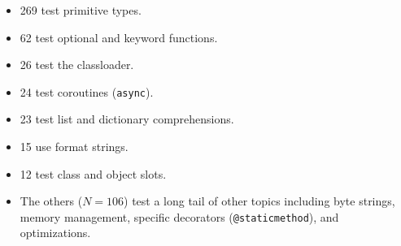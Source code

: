 \documentclass[english,cleveref,submission]{programming}
\newcommand{\code}[1]{\texttt{#1}}
\newcommand{\nnum}[1]{$N=#1$}
\begin{document}
\begin{itemize}
  \item 269 test primitive types.
  \item 62 test optional and keyword functions.
  \item 26 test the classloader.
  \item 24 test coroutines (\code{async}).
  \item 23 test list and dictionary comprehensions.
  \item 15 use format strings.
  \item 12 test class and object slots.
  \item The others (\nnum{106}) test a long tail of other topics
    including byte strings, memory management, specific decorators
    (\code{@staticmethod}), and optimizations.


\end{itemize}
\end{document}
